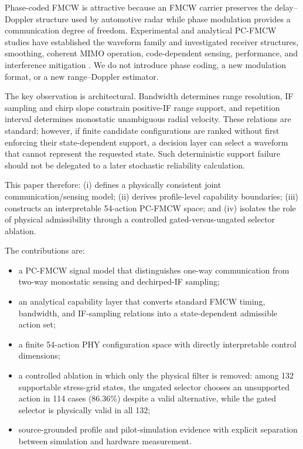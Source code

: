 \documentclass[journal]{IEEEtran}
\begin{document}
Phase-coded FMCW is attractive because an FMCW carrier preserves the delay--Doppler structure used by automotive radar while phase modulation provides a communication degree of freedom. Experimental and analytical PC-FMCW studies have established the waveform family and investigated receiver structures, smoothing, coherent MIMO operation, code-dependent sensing, performance, and interference mitigation \cite{kumbul2021experimental,kumbul2022receiver,kumbul2022smoothed,kumbul2022codes,kumbul2023mimo,kumbul2023performance,kumbul2024interference}. We do not introduce phase coding, a new modulation format, or a new range--Doppler estimator.

The key observation is architectural. Bandwidth determines range resolution, IF sampling and chirp slope constrain positive-IF range support, and repetition interval determines monostatic unambiguous radial velocity. These relations are standard; however, if finite candidate configurations are ranked without first enforcing their state-dependent support, a decision layer can select a waveform that cannot represent the requested state. Such deterministic support failure should not be delegated to a later stochastic reliability calculation.

This paper therefore: (i) defines a physically consistent joint communication/sensing model; (ii) derives profile-level capability boundaries; (iii) constructs an interpretable 54-action PC-FMCW space; and (iv) isolates the role of physical admissibility through a controlled gated-versus-ungated selector ablation.

The contributions are:
\begin{itemize}
\item a PC-FMCW signal model that distinguishes one-way communication from two-way monostatic sensing and dechirped-IF sampling;
\item an analytical capability layer that converts standard FMCW timing, bandwidth, and IF-sampling relations into a state-dependent admissible action set;
\item a finite 54-action PHY configuration space with directly interpretable control dimensions;
\item a controlled ablation in which only the physical filter is removed: among 132 supportable stress-grid states, the ungated selector chooses an unsupported action in 114 cases (86.36\%) despite a valid alternative, while the gated selector is physically valid in all 132;
\item source-grounded profile and pilot-simulation evidence with explicit separation between simulation and hardware measurement.
\end{itemize}
\end{document}

